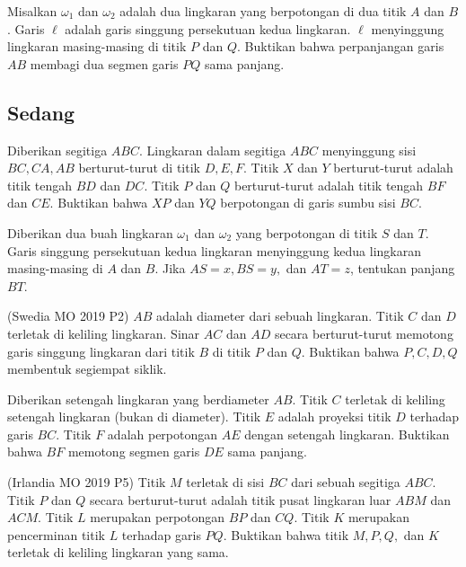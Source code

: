 \documentclass[11pt]{scrartcl}
\begin{document}
\begin{problem}
    Misalkan $\omega_1$ dan $\omega_2$ adalah dua lingkaran yang berpotongan di dua titik $A$ dan $B$. Garis $\ell$ adalah garis singgung persekutuan kedua lingkaran. $\ell$ menyinggung lingkaran  masing-masing di titik $P$ dan $Q$. Buktikan bahwa perpanjangan garis $AB$ membagi dua segmen garis $PQ$ sama panjang.
\end{problem}

\subsection{Sedang}
\begin{problem}
    Diberikan segitiga $ABC$. Lingkaran dalam segitiga $ABC$ menyinggung sisi $BC, CA, AB$ berturut-turut di titik $D, E, F$. Titik $X$ dan $Y$ berturut-turut adalah titik tengah $BD$ dan $DC$. Titik $P$ dan $Q$ berturut-turut adalah titik tengah $BF$ dan $CE$. Buktikan bahwa $XP$ dan $YQ$ berpotongan di garis sumbu sisi $BC$.
\end{problem}

\begin{problem}
    Diberikan dua buah lingkaran $\omega_1$ dan $\omega_2$ yang berpotongan di titik $S$ dan $T$. Garis singgung persekutuan kedua lingkaran menyinggung kedua lingkaran masing-masing di $A$ dan $B$. Jika $AS = x, BS = y,$ dan $AT = z$, tentukan panjang $BT$.
\end{problem}

\begin{problem}
    (Swedia MO 2019 P2) $AB$ adalah diameter dari sebuah lingkaran. Titik $C$ dan $D$ terletak di keliling lingkaran. Sinar $AC$ dan $AD$ secara berturut-turut memotong garis singgung lingkaran dari titik $B$ di titik $P$ dan $Q$. Buktikan bahwa $P, C, D, Q$ membentuk segiempat siklik.     
\end{problem}

\begin{problem}
    Diberikan setengah lingkaran yang berdiameter $AB$. Titik $C$ terletak di keliling setengah lingkaran (bukan di diameter). Titik $E$ adalah proyeksi titik $D$ terhadap garis $BC$. Titik $F$ adalah perpotongan $AE$ dengan setengah lingkaran. Buktikan bahwa $BF$ memotong segmen garis $DE$ sama panjang.
\end{problem}

\begin{problem}
    (Irlandia MO 2019 P5) Titik $M$ terletak di sisi $BC$ dari sebuah segitiga $ABC$. Titik $P$ dan $Q$ secara berturut-turut adalah titik pusat lingkaran luar $ABM$ dan $ACM$. Titik $L$ merupakan perpotongan $BP$ dan $CQ$. Titik $K$ merupakan pencerminan titik $L$ terhadap garis $PQ$. Buktikan bahwa titik $M, P, Q,$ dan $K$ terletak di keliling lingkaran yang sama.
\end{problem}
\end{document}
